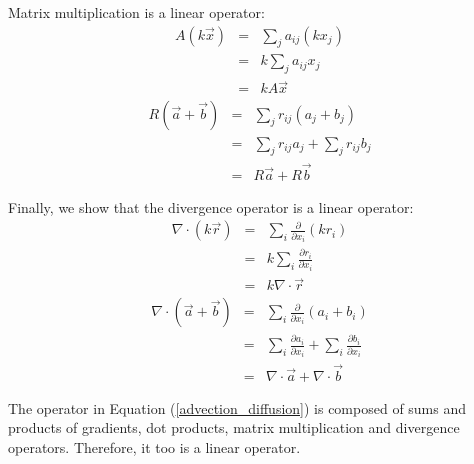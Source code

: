 Matrix multiplication is a linear operator:
\begin{eqnarray}
	A (k \vec x) & = & \sum_j a_{ij} (k x_j) \\
	  & = &  k \sum_j a_{ij} x_j \\
	  & = & k A \vec x
\end{eqnarray}
\begin{eqnarray}
	R (\vec a + \vec b) & = & \sum_j r_{ij} (a_j + b_j) \\
		& = & \sum_j r_{ij} a_j + \sum_j r_{ij} b_j \\
	 & = & R \vec a + R \vec b
\end{eqnarray}

Finally, we show that the divergence operator is a linear operator:
\begin{eqnarray}
	\nabla \cdot (k \vec r) & = & \sum_i \frac{\partial}{\partial x_i} (k r_i) \\
	& = & k \sum_i \frac{\partial r_i}{\partial x_i} \\
	& = & k \nabla \cdot \vec r
\end{eqnarray}
\begin{eqnarray}
	\nabla \cdot (\vec a + \vec b) & = & \sum_i \frac{\partial}{\partial x_i} (a_i + b_i) \\
	& = & \sum_i \frac{\partial a_i}{\partial x_i}
	+ \sum_i \frac{\partial b_i}{\partial x_i} \\
	& = & \nabla \cdot \vec a + \nabla \cdot \vec b
\end{eqnarray}

The operator in Equation (\ref{advection_diffusion}) is composed of sums and
products of gradients, dot products, matrix multiplication and divergence
operators. Therefore, it too is a linear operator.

